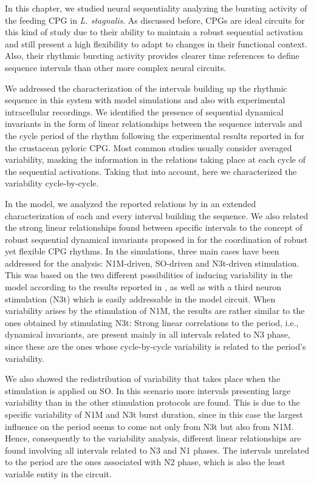 In this chapter, we studied neural sequentiality analyzing the bursting activity of the feeding CPG in \textit{L. stagnalis}. As discussed before, CPGs are ideal circuits for this kind of study due to their ability to maintain a robust sequential activation and still present a high flexibility to adapt to changes in their functional context. Also, their rhythmic bursting activity provides clearer time references to define sequence intervals than other more complex neural  circuits. 

We addressed the characterization of the intervals building up the rhythmic sequence in this system with model simulations and also with experimental intracellular recordings. We identified the presence of sequential dynamical invariants in the form of linear relationships between the sequence intervals and the cycle period of the rhythm following the experimental results reported in \textcite{elices_robust_2019} for the crustacean pyloric CPG. Most common studies usually consider averaged variability, masking the information in the relations taking place at each cycle of the sequential activations. Taking that into account, here we characterized the variability cycle-by-cycle. 

In the model, we analyzed the reported relations by \textcite{elliott_temporal_1991} in an extended characterization of each and every interval building the sequence. We also related the strong linear relationships found between specific intervals to the concept of robust sequential dynamical invariants proposed in \textcite{elices_robust_2019} for the coordination of robust yet flexible CPG rhythms. In the simulations, three main cases have been addressed for the analysis: N1M-driven, SO-driven and N3t-driven stimulation. This was based on the two different possibilities of inducing variability in the model according to the results reported in \textcite{vavoulis_dynamic_2007}, as well as with a third neuron stimulation (N3t) which is easily addressable in the model circuit. When variability arises by the stimulation of N1M, the results are rather similar to the ones obtained by stimulating N3t: Strong linear correlations to the period, i.e., dynamical invariants, are present mainly in all intervals related to N3 phase, since these are the ones whose cycle-by-cycle variability is related to the period's variability.  

We also showed the redistribution of variability that takes place when the stimulation is applied on SO. In this scenario more intervals presenting large variability than in the other stimulation protocols are found. This is due to the specific variability of N1M and N3t burst duration, since in this case the largest influence on the period seems to come not only from N3t but also from N1M. Hence, consequently to the variability analysis, different linear relationships are found involving all intervals related to N3 and N1 phases. The intervals unrelated to the period are the ones associated with N2 phase, which is also the least variable entity in the circuit. 

